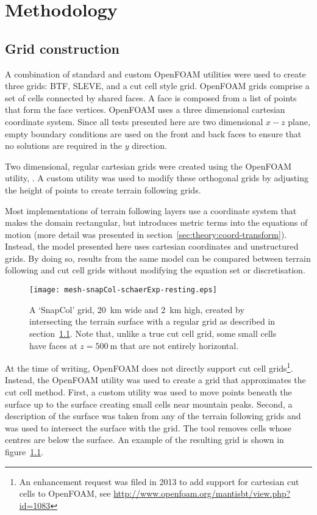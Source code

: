\chapter{Methodology}

\section{Grid construction}
\label{sec:method:grid}

A combination of standard and custom OpenFOAM utilities were used to create three grids: BTF, SLEVE, and a cut cell style grid.  OpenFOAM grids comprise a set of cells connected by shared faces.  A face is composed from a list of points that form the face vertices.
OpenFOAM uses a three dimensional cartesian coordinate system.  Since all tests presented here are two dimensional $x-z$ plane, empty boundary conditions are used on the front and back faces to ensure that no solutions are required in the $y$ direction.

Two dimensional, regular cartesian grids were created using the OpenFOAM utility, .  A custom utility was used to modify these orthogonal grids by adjusting the height of points to create terrain following grids.

Most implementations of terrain following layers use a coordinate system that makes the domain rectangular, but introduces metric terms into the equations of motion (more detail was presented in section~\ref{sec:theory:coord-transform}).  Instead, the model presented here uses cartesian coordinates and unstructured grids.  By doing so, results from the same model can be compared between terrain following and cut cell grids without modifying the equation set or discretisation.

\begin{figure}
	\centerfloat
	\texttt{[image: mesh-snapCol-schaerExp-resting.eps]}
	\caption{A `SnapCol' grid, \SI{20}{\kilo\meter} wide and \SI{2}{\kilo\meter} high, created by intersecting the terrain surface with a regular grid as described in section~\ref{sec:method:grid}.  Note that, unlike a true cut cell grid, some small cells have faces at $z = \SI{500}{\meter}$ that are not entirely horizontal.}
	\label{fig:method:cut-cell}
\end{figure}

At the time of writing, OpenFOAM does not directly support cut cell grids\footnote{An enhancement request was filed in 2013 to add support for cartesian cut cells to OpenFOAM, see \url{http://www.openfoam.org/mantisbt/view.php?id=1083}}.  Instead, the  OpenFOAM utility was used to create a grid that approximates the cut cell method.  First, a custom utility was used to move points beneath the surface up to the surface creating small cells near mountain peaks.  Second, a description of the surface was taken from any of the terrain following grids and  was used to intersect the surface with the grid.  The tool removes cells whose centres are below the surface.  An example of the resulting grid is shown in figure~\ref{fig:method:cut-cell}.

